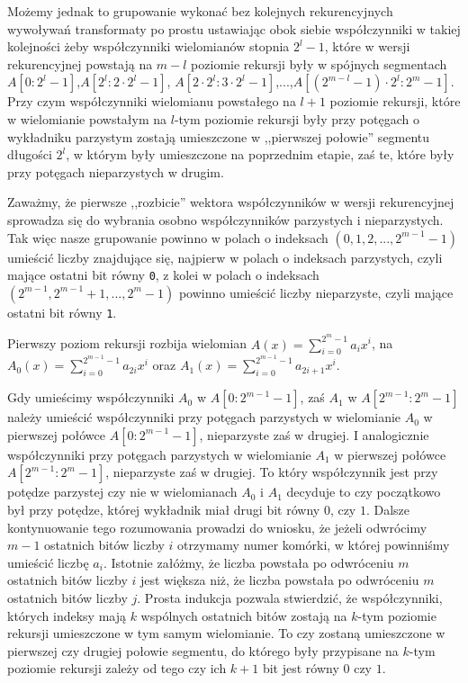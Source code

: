 \documentclass{article}
\begin{document}
Możemy jednak to grupowanie wykonać bez kolejnych rekurencyjnych wywoływań transformaty po prostu ustawiając obok siebie współczynniki w takiej kolejności 
żeby współczynniki wielomianów stopnia $2^l-1$, które w wersji rekurencyjnej powstają na $m-l$ poziomie rekursji
były w spójnych segmentach $A[0:2^l-1]$,$A[2^l:2 \cdot 2^l-1]$,
$A[2 \cdot 2^l:3\cdot 2^l-1]$,...,$A[(2^{m-l}-1)\cdot 2^l:2^m-1]$. Przy czym współczynniki wielomianu powstałego na
$l+1$ poziomie rekursji, które w wielomianie powstałym na $l$-tym poziomie rekursji były przy 
potęgach o wykładniku parzystym zostają umieszczone w ,,pierwszej połowie'' segmentu 
długości $2^l$, w którym były umieszczone na poprzednim etapie, zaś te, które były przy 
potęgach nieparzystych w drugim.

Zaważmy, że pierwsze ,,rozbicie'' wektora współczynników w wersji rekurencyjnej sprowadza się
do wybrania osobno współczynników parzystych i nieparzystych. Tak więc nasze grupowanie
powinno w polach o indeksach $(0,1,2,...,2^{m-1}-1)$ umieścić liczby znajdujące się, najpierw 
w polach o indeksach parzystych, czyli mające ostatni bit równy \texttt{0}, z kolei 
w polach o indeksach $(2^{m-1},2^{m-1}+1,...,2^m-1)$ powinno umieścić liczby nieparzyste, czyli
mające ostatni bit równy \texttt{1}. 

Pierwszy poziom rekursji rozbija wielomian
$A(x)=\sum_{i=0}^{2^m-1}a_ix^i$, na $A_0(x)=\sum_{i=0}^{2^{m-1}-1}a_{2i}x^{i}$ oraz
$A_1(x)=\sum_{i=0}^{2^{m-1}-1}a_{2i+1}x^{i}$. 

Gdy umieścimy współczynniki $A_0$ w $A[0:2^{m-1}-1]$, zaś $A_1$ w $A[2^{m-1}:2^m-1]$ należy umieścić 
współczynniki przy potęgach parzystych w wielomianie $A_0$ w pierwszej połówce 
$A[0:2^{m-1}-1]$, nieparzyste zaś w drugiej. I analogicznie współczynniki przy potęgach 
parzystych w wielomianie $A_1$ w pierwszej połówce 
$A[2^{m-1}:2^{m}-1]$, nieparzyste zaś w drugiej. To który współczynnik jest przy potędze 
parzystej czy nie w wielomianach $A_0$ i $A_1$ decyduje to czy początkowo był przy potędze,
której wykładnik miał drugi bit równy $0$, czy $1$. Dalsze kontynuowanie tego rozumowania 
prowadzi do wniosku, że jeżeli odwrócimy $m-1$ ostatnich bitów liczby $i$ otrzymamy numer komórki,
w której powinniśmy umieścić liczbę $a_i$. Istotnie załóżmy, że liczba powstała po odwróceniu $m$ ostatnich bitów liczby $i$ jest większa 
niż, że liczba powstała po odwróceniu $m$ ostatnich bitów liczby $j$. Prosta indukcja pozwala stwierdzić, że współczynniki, których indeksy mają $k$ 
wspólnych ostatnich 
bitów zostają na $k$-tym poziomie rekursji umieszczone w tym samym wielomianie. 
To czy zostaną umieszczone w pierwszej czy drugiej połowie segmentu, do którego były przypisane 
na $k$-tym poziomie rekursji zależy od tego czy ich $k+1$ bit jest równy $0$ czy $1$.
\end{document}
